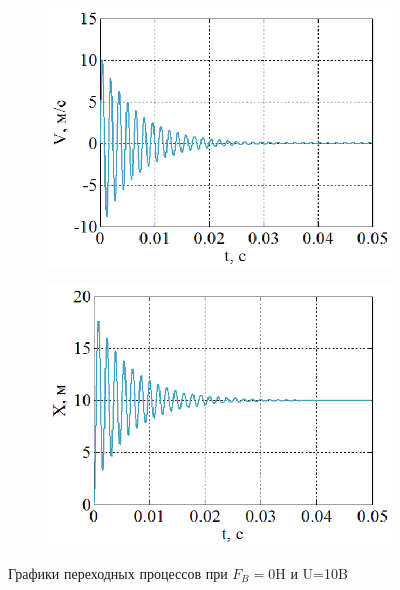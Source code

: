 \documentclass[a4paper,12pt]{article} %
\begin{document}
\begin{figure}[H]
\begin{subfigure}[b]{0.48\textwidth}
		\includegraphics[width = \textwidth]{scheme/V0}
	\end{subfigure}
	\hfill
	\begin{subfigure}[b]{0.48\textwidth}
		\includegraphics[width = \textwidth]{scheme/X0}
	\end{subfigure}
	\caption{Графики переходных процессов при $F_B=0$H и U=10B}
	\label{UFVX0}
\end{figure}

\newpage
\end{document}
